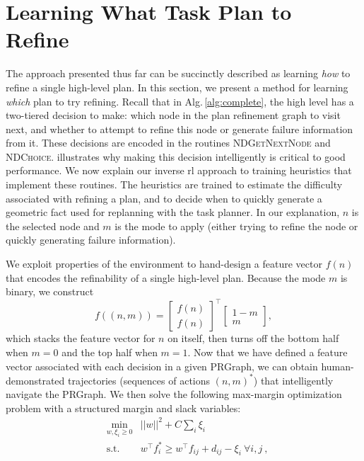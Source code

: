 \section{Learning What Task Plan to Refine}
The approach presented thus far can be succinctly described as learning \emph{how} to
refine a single high-level plan. In this section, we present a method for learning
\emph{which} plan to try refining. Recall that in Alg.\,\ref{alg:complete}, the high
level has a two-tiered decision to make: which node in the plan refinement graph to
visit next, and whether to attempt to refine this node or generate failure information
from it. These decisions are encoded in the routines \textsc{NDGetNextNode}
and \textsc{NDChoice}.  illustrates why making this decision intelligently is critical
to good performance. We now explain our inverse {\sc rl}
approach to training heuristics that implement these routines. The heuristics are trained to estimate
the difficulty associated with refining a plan, and to decide when to quickly generate
a geometric fact used for replanning with the task planner. In our explanation, $n$ is the selected
node and $m$ is the mode to apply (either trying to refine the node or quickly generating failure information).

We exploit properties of the environment to hand-design a feature vector $f(n)$ that encodes the refinability
of a single high-level plan. Because the mode $m$ is binary,
we construct $$f((n, m)) = \begin{bmatrix} f(n) \\ f(n) \end{bmatrix}^\top \begin{bmatrix} 1 - m \\ m \end{bmatrix},$$
which stacks the feature vector for $n$ on itself, then turns off the bottom half when $m = 0$ and the
top half when $m = 1$. Now that we have defined a feature vector associated with each decision in a given {\sc PRGraph},
we can obtain human-demonstrated trajectories (sequences of actions $(n, m)^{*}$) that intelligently
navigate the {\sc PRGraph}. We then solve the following max-margin optimization problem with a structured margin and slack variables:
\begin{align*}
&\min_{w, \xi_i \geq 0} & ||w||^2 + C \sum_i \xi_i\\
&\text{s.t.} & w^{\top}f^*_i \geq w^{\top}f_{ij} +  d_{ij} - \xi_{i}\ \forall i, j \ ,
\end{align*}

